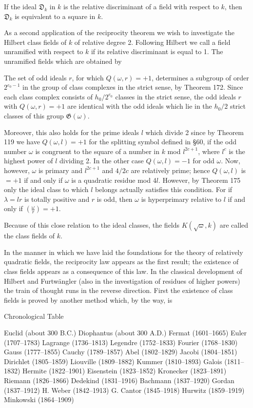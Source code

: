 If the ideal $\mathfrak{D}_k$ in $k$ is the relative discriminant of a field with respect to $k$, then $\mathfrak{D}_k$ is equivalent to a square in $k$.

As a second application of the reciprocity theorem we wish to investigate the Hilbert class fields of $k$ of relative degree 2. Following Hilbert we call a field unramified with respect to $k$ if its relative discriminant is equal to 1. The unramified fields which are obtained by

The set of odd ideals $r$, for which $Q(\omega, r) = +1$, determines a subgroup of order $2^{e_0-1}$ in the group of class complexes in the strict sense, by Theorem 172. Since each class complex consists of $h_0/2^{e_0}$ classes in the strict sense, the odd ideals $r$ with $Q(\omega, r) = +1$ are identical with the odd ideals which lie in the $h_0/2$ strict classes of this group $\mathfrak{G}(\omega)$.

Moreover, this also holds for the prime ideals $l$ which divide 2 since by Theorem 119 we have $Q(\omega, l) = +1$ for the splitting symbol defined in §60, if the odd number $\omega$ is congruent to the square of a number in $k$ mod $l^{2c+1}$, where $l^c$ is the highest power of $l$ dividing 2. In the other case $Q(\omega, l) = -1$ for odd $\omega$. Now, however, $\omega$ is primary and $l^{2c+1}$ and $4/2c$ are relatively prime; hence $Q(\omega, l)$ is $= +1$ if and only if $\omega$ is a quadratic residue mod 4$l$. However, by Theorem 175 only the ideal class to which $l$ belongs actually satisfies this condition. For if $\lambda = lr$ is totally positive and $r$ is odd, then $\omega$ is hyperprimary relative to $l$ if and only if $(\frac{\omega}{r}) = +1$.

Because of this close relation to the ideal classes, the fields $K(\sqrt{\omega}, k)$ are called the class fields of $k$.

In the manner in which we have laid the foundations for the theory of relatively quadratic fields, the reciprocity law appears as the first result; the existence of class fields appears as a consequence of this law. In the classical development of Hilbert and Furtwängler (also in the investigation of residues of higher powers) the train of thought runs in the reverse direction. First the existence of class fields is proved by another method which, by the way, is

Chronological Table

Euclid (about 300 B.C.)
Diophantus (about 300 A.D.)
Fermat (1601–1665)
Euler (1707–1783)
Lagrange (1736–1813)
Legendre (1752–1833)
Fourier (1768–1830)
Gauss (1777–1855)
Cauchy (1789–1857)
Abel (1802–1829)
Jacobi (1804–1851)
Dirichlet (1805–1859)
Liouville (1809–1882)
Kummer (1810–1893)
Galois (1811–1832)
Hermite (1822–1901)
Eisenstein (1823–1852)
Kronecker (1823–1891)
Riemann (1826–1866)
Dedekind (1831–1916)
Bachmann (1837–1920)
Gordan (1837–1912)
H. Weber (1842–1913)
G. Cantor (1845–1918)
Hurwitz (1859–1919)
Minkowski (1864–1909)

